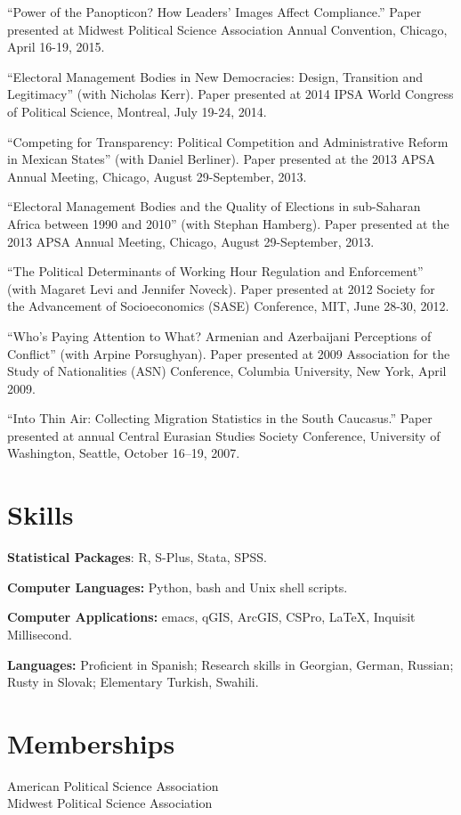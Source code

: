 \documentclass[margin,line]{res}
\begin{document}
{\begin{resume}
``Power of the Panopticon? How Leaders' Images Affect Compliance.''
Paper presented at Midwest Political Science Association Annual
Convention, Chicago, April 16-19, 2015.

``Electoral Management Bodies in New Democracies:
Design, Transition and Legitimacy'' (with Nicholas Kerr). Paper
presented at 2014 IPSA World Congress of Political Science, Montreal, July 19-24, 2014. 

``Competing for Transparency: Political Competition and Administrative
Reform in Mexican States'' (with Daniel Berliner). Paper presented at
the 2013 APSA Annual Meeting, Chicago, August 29-September, 2013.

``Electoral Management Bodies and the Quality of Elections in
 sub-Saharan Africa between 1990 and 2010'' (with Stephan Hamberg).
Paper presented at
the 2013 APSA Annual Meeting, Chicago, August 29-September, 2013.

 ``The Political Determinants of Working Hour Regulation and Enforcement'' (with Magaret Levi and Jennifer Noveck). Paper presented at 2012 Society for the Advancement of
Socioeconomics (SASE) Conference, MIT, June 28-30, 2012.

``Who's Paying Attention to What? Armenian
 and Azerbaijani Perceptions of Conflict''  (with Arpine Porsughyan). Paper presented at 2009
 Association for the Study of Nationalities (ASN) Conference, Columbia
 University, New York, April 2009.

``Into Thin Air: Collecting Migration Statistics in the South
Caucasus.'' Paper presented at annual Central Eurasian Studies
Society Conference, University of Washington, Seattle, October 16--19, 2007.

\section{\sc Skills} 
\textbf{Statistical Packages}:  R, S-Plus, Stata, SPSS. \par\smallskip
\textbf{Computer Languages:} Python, bash and Unix shell scripts. \par\smallskip
\textbf{Computer Applications:} emacs, qGIS, ArcGIS, CSPro,  \LaTeX, Inquisit Millisecond.\par\smallskip
\textbf{Languages:} Proficient in Spanish; Research skills in
  Georgian, German, Russian; Rusty in Slovak; Elementary Turkish, Swahili.

\section{\sc Memberships}
American Political Science Association \\
Midwest Political Science Association


\end{resume}}
\end{document}
